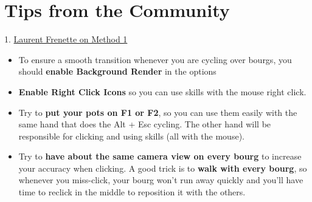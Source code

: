 \documentclass{article}
\begin{document}
\section{Tips from the Community}
\label{appendix: Tips}
1. \href{https://www.youtube.com/watch?v=Loo_phNvK50&lc=UgwaeU81GHIVYZ_IGgl4AaABAg}{Laurent Frenette on Method 1}

\begin{itemize}
  \item To ensure a smooth transition whenever you are cycling over bourgs, you should \textbf{enable Background Render} in the options
  \item \textbf{Enable Right Click Icons} so you can use skills with the mouse right click.
  \item Try to \textbf{put your pots on F1 or F2}, so you can use them easily with the same hand that does the Alt + Esc cycling. The other hand will be responsible for clicking and using skills (all with the mouse).
  \item Try to \textbf{have about the same camera view on every bourg} to increase your accuracy when clicking. A good trick is to \textbf{walk with every bourg}, so whenever you miss-click, your bourg won't run away quickly and you'll have time to reclick in the middle to reposition it with the others.
\end{itemize}
\end{document}
